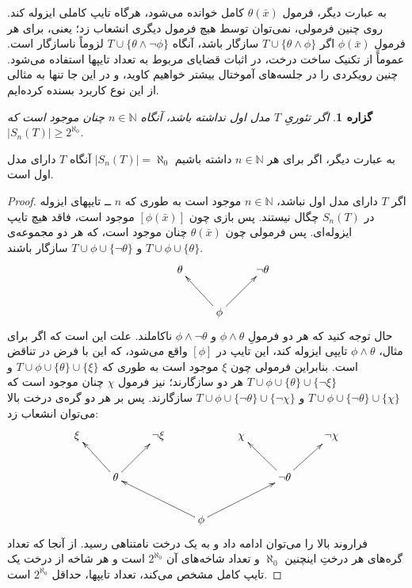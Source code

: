 \documentclass[12pt,a4paper]{article}
\theoremstyle{colorhead}
\newtheorem{prop}[thm]{گزاره}
\begin{document}
به عبارت دیگر، فرمول
$\theta(\bar{x})$
کامل خوانده می‌شود، هرگاه تایپ کاملی ایزوله کند. روی چنین فرمولی، نمی‌توان توسط هیچ فرمول دیگری انشعاب زد؛ یعنی، برای هر فرمولِ 
$\phi(\bar{x})$
اگر
$T\cup \{\theta\wedge \phi\}$
سازگار باشد، آنگاه 
$T\cup \{\theta\wedge\neg\phi\}$
لزوماً ناسازگار است. عموماً از تکنیک ساخت درخت، در اثبات قضایای مربوط به تعداد تایپها استفاده می‌شود. چنین رویکردی را در جلسه‌های آموختال بیشتر خواهیم کاوید، و در این جا تنها به مثالی از این نوع کاربرد بسنده کرده‌ایم. 
\begin{prop}
\label{deraxt1}
اگر تئوریِ
$T$
مدل اول نداشته باشد، آنگاه 
$n\in \mathbb{N}$
چنان موجود است که 
\mbox{$|S_n(T)|\geq 2^{\aleph_0}$}.
\end{prop}
به عبارت دیگر، اگر برای هر
$n\in \mathbb{N}$
داشته باشیم
$|S_n(T)|=\aleph_0$
آنگاه 
$T$
دارای مدل اول است.
\begin{proof}
اگر
$T$
دارای مدل اول نباشد،
$n\in \mathbb{N}$
موجود است به طوری که 
$n$ ــ
تایپهای ایزوله در
$S_n(T)$
چگال نیستند. پس بازی چون
$[\phi(\bar{x})]$
موجود است، فاقد هیچ تایپ ایزوله‌ای. پس فرمولی چون
$\theta(\bar{x})$
چنان موجود است،  که هر دو مجموعه‌ی
$T\cup \phi\cup \{\theta\}$
و
$T\cup\phi\cup \{\neg\theta\}$
سازگار باشند.
\[
\xymatrix{
& \theta & & \neg\theta\\
&& \phi \ar[ul]\ar[ur]
}
\]
حال توجه کنید که هر دو فرمولِ
$\phi\wedge\theta$
و 
$\phi\wedge\neg \theta$
ناکاملند. علت این است که اگر برای مثال،
$\phi\wedge \theta$
تایپی ایزوله کند، این تایپ در
$[\phi]$
واقع می‌شود، که این با فرض در تناقض است. بنابراین فرمولی چون
$\xi$
موجود است به طوری که 
$T\cup \phi\cup \{\theta\}\cup \{\xi\}$
و
$T\cup\phi\cup \{\theta\}\cup \{\neg \xi\}$
هر دو سازگارند؛‌ نیز فرمول
$\chi$
چنان موجود است که 
$T\cup\phi\cup \{\neg \theta\}\cup \{ \chi\}$
و
$T\cup\phi\cup \{\neg \theta\}\cup \{\neg \chi\}$
سازگارند. پس
 بر هر دو گره‌ی درخت بالا می‌توان انشعاب زد:
\[
\xymatrix{
\xi & & \neg \xi& & \chi & & \neg \chi\\
 & \theta\ar[ul]\ar[ur] & & & & \neg\theta\ar[ul]\ar[ur]& \\
 & & & \phi\ar[ull]\ar[urr]& & & \\
}
\]
فراروند بالا را می‌توان ادامه داد و به یک درخت نامتناهی رسید. از آنجا که تعداد گره‌های هر درختِ اینچنین
$\aleph_0$
و
تعداد شاخه‌های آن
$2^{\aleph_0}$
است و هر شاخه از درخت یک تایپ کامل مشخص می‌کند، تعداد تایپها، حداقل
$2^{\aleph_0}$
است.
\end{proof}
\pagebreak
\end{document}
